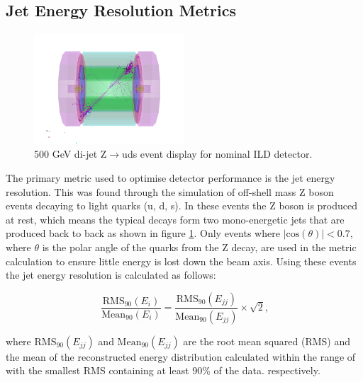 \subsection{Jet Energy Resolution Metrics}
\begin{figure}
\centering
\includegraphics[width=0.5\textwidth]{OptimisationStudies/Plots/MethodDescription/500GeVEvent.png}
\caption[500 GeV di-jet Z$\rightarrow$uds event display for nominal ILD detector.]{500 GeV di-jet Z$\rightarrow$uds event display for nominal ILD detector.}
\label{fig:500GeVzudsevtdisplay}
\end{figure} 

The primary metric used to optimise detector performance is the jet energy resolution.  This was found through the simulation of off-shell mass Z boson events decaying to light quarks (u, d, s).  In these events the Z boson is produced at rest, which means the typical decays form two mono-energetic jets that are produced back to back as shown in figure \ref{fig:500GeVzudsevtdisplay}.  Only events where $|\text{cos}(\theta)| < 0.7$, where $\theta$ is the polar angle of the quarks from the Z decay, are used in the metric calculation to ensure little energy is lost down the beam axis.  Using these events the jet energy resolution is calculated as follows: 

\begin{equation} 
\frac{\text{RMS}_{90}(E_{i})}{\text{Mean}_{90}(E_{i})} = \frac{\text{RMS}_{90}(E_{jj})}{\text{Mean}_{90}(E_{jj})} \times \sqrt{2} \text{,}
\end{equation}

\begin{flushleft}
where $\text{RMS}_{90}(E_{jj})$ and $\text{Mean}_{90}(E_{jj})$ are the root mean squared (RMS) and the mean of the reconstructed energy distribution calculated within the range of with the smallest RMS containing at least 90\% of the data.
respectively.
\end{flushleft}

